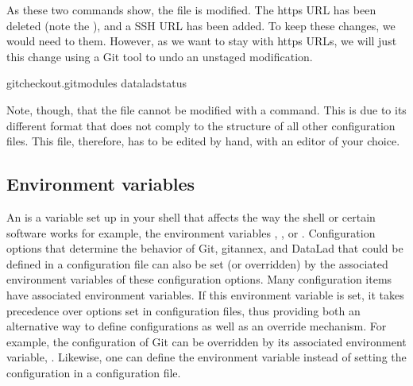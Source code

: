 \sphinxAtStartPar
As these two commands show, the  file is modified. The https URL
has been deleted (note the \sphinxcode{\sphinxupquote{\sphinxhyphen{}}}), and a SSH URL has been added. To keep these
changes, we would need to  them. However, as we want to stay with
https URLs, we will just  this change \textendash{} using a Git tool to undo an
unstaged modification.

\begin{sphinxVerbatim}[commandchars=\\\{\}]
gitcheckout.gitmodules
dataladstatus
\end{sphinxVerbatim}

\sphinxAtStartPar
Note, though, that the  file cannot be modified with a 
command. This is due to its different format that does not comply to the
 structure of all other configuration files. This file, therefore,
has to be edited by hand, with an editor of your choice.

\ignorespaces 

\subsection{Environment variables}
\label{\detokenize{basics/101-123-config2:environment-variables}}\label{\detokenize{basics/101-123-config2:envvars}}\label{\detokenize{basics/101-123-config2:index-4}}
\sphinxAtStartPar
An {\hyperref[\detokenize{glossary:term-environment-variable}]{}} is a variable set up in your shell
that affects the way the shell or certain software works \textendash{} for example,
the environment variables , , or .
Configuration options that determine the behavior of Git, git\sphinxhyphen{}annex, and
DataLad that could be defined in a configuration file can also be set (or overridden)
by the associated environment variables of these configuration options.
Many configuration items have associated environment variables.
If this environment variable is set, it takes precedence over options set in
configuration files, thus providing both an alternative way to define configurations
as well as an override mechanism. For example, the 
configuration of Git can be overridden by its associated environment variable,
. Likewise, one can define the environment variable instead
of setting the  configuration in a configuration file.

